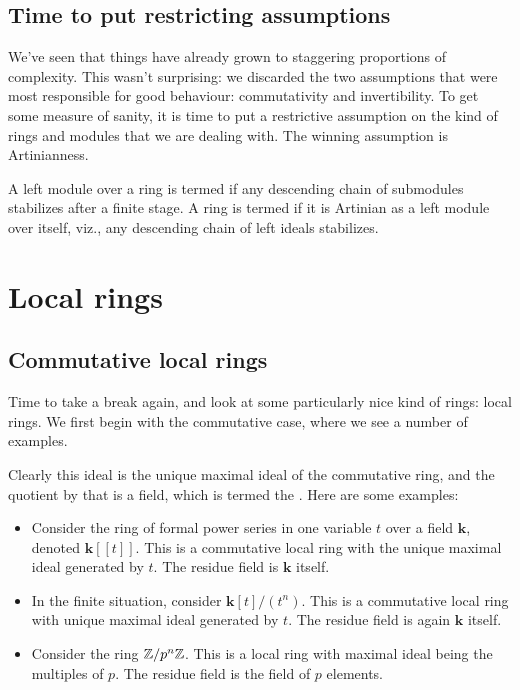 \documentclass[a4paper]{amsart}
\newcommand{\field}{\mathbf{k}}
\begin{document}
\subsection{Time to put restricting assumptions}

We've seen that things have already grown to staggering proportions of
complexity. This wasn't surprising: we discarded the two assumptions
that were most responsible for good behaviour: commutativity and
invertibility. To get some measure of sanity, it is time to put a
restrictive assumption on the kind of rings and modules that we are
dealing with. The winning assumption is Artinianness.

\begin{definer}
  A left module over a ring is termed
   if any descending chain of
  submodules stabilizes after a finite stage. A ring is termed
   if it is Artinian as a left
  module over itself, viz., any descending chain of left ideals stabilizes.
\end{definer}

\section{Local rings}

\subsection{Commutative local rings}

Time to take a break again, and look at some particularly nice kind of
rings: local rings. We first begin with the commutative case, where we
see a number of examples.

\begin{definer}
\end{definer}

Clearly this ideal is the unique maximal ideal of the commutative
ring, and the quotient by that is a field, which is termed the
.  Here are some examples:

\begin{itemize}

\item Consider the ring of formal power series in one variable $t$ over
  a field $\field$, denoted $\field[[t]]$. This is a commutative local
  ring with the unique maximal ideal generated by $t$. The residue
  field is $\field$ itself.

\item In the finite situation, consider $\field[t]/(t^n)$. This is a
  commutative local ring with unique maximal ideal generated by $t$.
  The residue field is again $\field$ itself.

\item Consider the ring $\mathbb{Z}/p^n\mathbb{Z}$. This is a local ring with maximal
  ideal being the multiples of $p$. The residue field is the field of
  $p$ elements.

\end{itemize}
\end{document}
